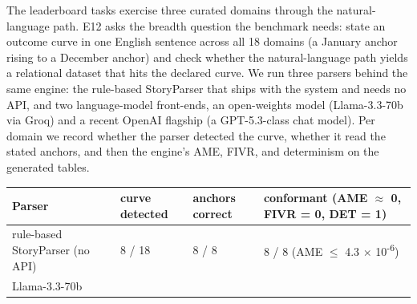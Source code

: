 The leaderboard tasks exercise three curated domains through the
natural-language path. E12 asks the breadth question the benchmark
needs: state an outcome curve in one English sentence across all 18
domains (a January anchor rising to a December anchor) and check whether
the natural-language path yields a relational dataset that hits the
declared curve. We run three parsers behind the same engine: the
rule-based StoryParser that ships with the system and needs no API, and
two language-model front-ends, an open-weights model (Llama-3.3-70b via
Groq) and a recent OpenAI flagship (a GPT-5.3-class chat model). Per
domain we record whether the parser detected the curve, whether it read
the stated anchors, and then the engine's AME, FIVR, and determinism on
the generated tables.

\begin{longtable}[]{@{}llll@{}}
\toprule
\begin{minipage}[b]{0.22\columnwidth}\raggedright
Parser\strut
\end{minipage} & \begin{minipage}[b]{0.22\columnwidth}\raggedright
curve detected\strut
\end{minipage} & \begin{minipage}[b]{0.22\columnwidth}\raggedright
anchors correct\strut
\end{minipage} & \begin{minipage}[b]{0.22\columnwidth}\raggedright
conformant (AME \ensuremath{\approx} 0, FIVR = 0, DET = 1)\strut
\end{minipage}\tabularnewline
\midrule
\endhead
\begin{minipage}[t]{0.22\columnwidth}\raggedright
rule-based StoryParser (no API)\strut
\end{minipage} & \begin{minipage}[t]{0.22\columnwidth}\raggedright
8 / 18\strut
\end{minipage} & \begin{minipage}[t]{0.22\columnwidth}\raggedright
8 / 8\strut
\end{minipage} & \begin{minipage}[t]{0.22\columnwidth}\raggedright
8 / 8 (AME \ensuremath{\le} 4.3 \ensuremath{\times}
10\textsuperscript{-6})\strut
\end{minipage}\tabularnewline
\begin{minipage}[t]{0.22\columnwidth}\raggedright
Llama-3.3-70b\strut
\end{minipage} & \begin{minipage}[t]{0.22\columnwidth}\raggedright

\end{minipage}
\end{longtable}
